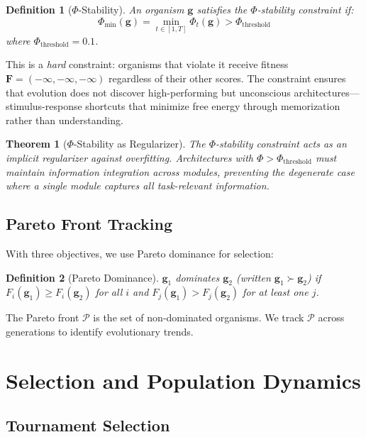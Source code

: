\documentclass[11pt,a4paper]{article}
\newtheorem{definition}{Definition}
\newtheorem{theorem}{Theorem}
\begin{document}
\begin{definition}[$\Phi$-Stability]
An organism $\mathbf{g}$ satisfies the $\Phi$-stability constraint if:
\begin{equation}
\Phi_{\min}(\mathbf{g}) = \min_{t \in [1,T]} \Phi_t(\mathbf{g}) > \Phi_{\text{threshold}}
\end{equation}
where $\Phi_{\text{threshold}} = 0.1$.
\end{definition}

This is a \emph{hard} constraint: organisms that violate it receive fitness $\mathbf{F} = (-\infty, -\infty, -\infty)$ regardless of their other scores. The constraint ensures that evolution does not discover high-performing but unconscious architectures---stimulus-response shortcuts that minimize free energy through memorization rather than understanding.

\begin{theorem}[$\Phi$-Stability as Regularizer]
The $\Phi$-stability constraint acts as an implicit regularizer against overfitting. Architectures with $\Phi > \Phi_{\text{threshold}}$ must maintain information integration across modules, preventing the degenerate case where a single module captures all task-relevant information.
\end{theorem}

\subsection{Pareto Front Tracking}

With three objectives, we use Pareto dominance for selection:

\begin{definition}[Pareto Dominance]
$\mathbf{g}_1$ dominates $\mathbf{g}_2$ (written $\mathbf{g}_1 \succ \mathbf{g}_2$) if $F_i(\mathbf{g}_1) \geq F_i(\mathbf{g}_2)$ for all $i$ and $F_j(\mathbf{g}_1) > F_j(\mathbf{g}_2)$ for at least one $j$.
\end{definition}

The Pareto front $\mathcal{P}$ is the set of non-dominated organisms. We track $\mathcal{P}$ across generations to identify evolutionary trends.

\section{Selection and Population Dynamics}

\subsection{Tournament Selection}
\end{document}

